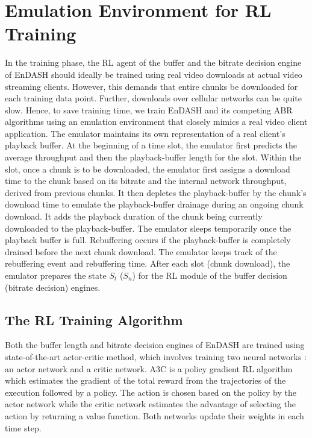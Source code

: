 \section{Emulation Environment for \acs{RL} Training}
\label{sec:chap04:environment}
In the training phase, the \ac{RL} agent of the buffer and the bitrate decision engine of EnDASH should ideally be trained using real video downloads at actual video streaming clients.
However, this demands that entire chunks be downloaded for each training data point. Further, downloads over cellular networks can be quite slow. Hence, to save training time, we train EnDASH and its competing  \ac{ABR} algorithms using an emulation environment that closely mimics a real video client application. The emulator maintains its own representation of a real client's playback buffer. At the beginning of a time slot, the emulator first predicts the average throughput and then the playback-buffer length for the slot. Within the slot, once a chunk is to be downloaded, the emulator first assigns a download time to the chunk based  on its bitrate and the internal network throughput, derived from previous chunks. It then depletes the playback-buffer by the chunk's download time to emulate the playback-buffer drainage during an ongoing chunk download. It adds the playback duration of the  chunk being currently downloaded to the playback-buffer. The emulator sleeps temporarily once the playback buffer is full. Rebuffering occurs if the playback-buffer is completely drained before the next chunk download. The emulator keeps track of the rebuffering event and rebuffering time. After each slot (chunk download), the emulator prepares the state $S_t$ ($S_n$) for the \ac{RL} module of the buffer decision (bitrate decision) engines.
\subsection{The \acs{RL} Training Algorithm}
Both the buffer length and bitrate decision engines of EnDASH are trained using  state-of-the-art actor-critic method, which involves training two neural networks \cite{mao2017neural}: an actor network and a critic network. \ac{A3C} is a policy gradient \ac{RL} algorithm which estimates the gradient of the total reward from the trajectories of the execution followed by a policy. The action is chosen based on the policy by the actor network while the critic network estimates the advantage of selecting the action by returning a value function. Both networks update their weights in each time step.

